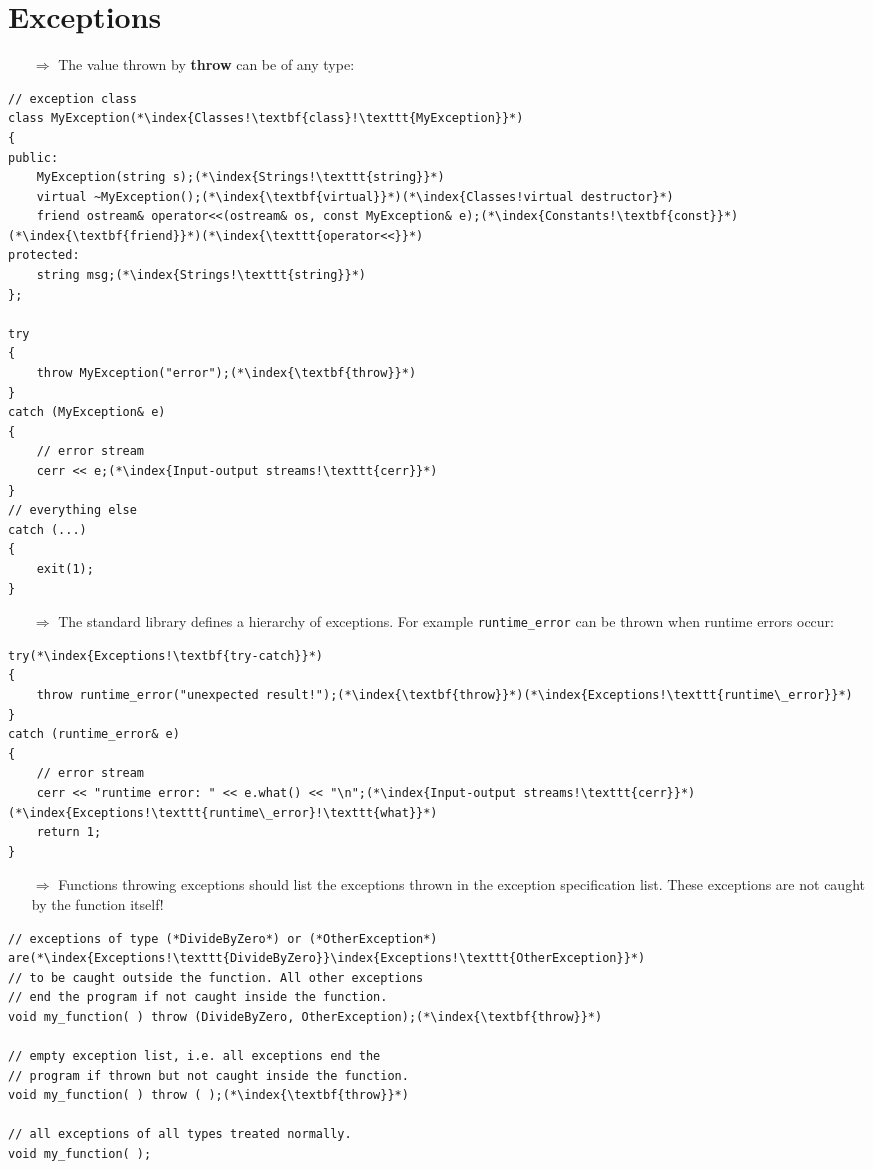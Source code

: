 \documentclass[10pt]{article}
\begin{document}
\section{Exceptions}
\small
\begin{enumerate}
\item[$\Rightarrow$] The value thrown by \textbf{throw} can be of any type:
\end{enumerate}
\begin{lstlisting}
// exception class
class MyException(*\index{Classes!\textbf{class}!\texttt{MyException}}*)
{
public:
    MyException(string s);(*\index{Strings!\texttt{string}}*)
    virtual ~MyException();(*\index{\textbf{virtual}}*)(*\index{Classes!virtual destructor}*)
    friend ostream& operator<<(ostream& os, const MyException& e);(*\index{Constants!\textbf{const}}*)(*\index{\textbf{friend}}*)(*\index{\texttt{operator<<}}*)
protected:
    string msg;(*\index{Strings!\texttt{string}}*)
};

try
{
    throw MyException("error");(*\index{\textbf{throw}}*)
}
catch (MyException& e)
{
    // error stream
    cerr << e;(*\index{Input-output streams!\texttt{cerr}}*)
}
// everything else
catch (...)
{
    exit(1);
}
\end{lstlisting}
\begin{enumerate}
\item[$\Rightarrow$] The standard library defines a hierarchy of exceptions.  For example \texttt{runtime\_error} can be thrown when runtime errors occur:
\end{enumerate}
\begin{lstlisting}
try(*\index{Exceptions!\textbf{try-catch}}*)
{
    throw runtime_error("unexpected result!");(*\index{\textbf{throw}}*)(*\index{Exceptions!\texttt{runtime\_error}}*)
}
catch (runtime_error& e)
{
    // error stream
    cerr << "runtime error: " << e.what() << "\n";(*\index{Input-output streams!\texttt{cerr}}*)(*\index{Exceptions!\texttt{runtime\_error}!\texttt{what}}*)
    return 1;
}
\end{lstlisting}
\begin{enumerate}
\item[$\Rightarrow$] Functions throwing exceptions should list the exceptions thrown in
the exception specification list. These exceptions are not caught by the function itself!
\end{enumerate}
\begin{lstlisting}
// exceptions of type (*DivideByZero*) or (*OtherException*) are(*\index{Exceptions!\texttt{DivideByZero}}\index{Exceptions!\texttt{OtherException}}*)
// to be caught outside the function. All other exceptions 
// end the program if not caught inside the function.
void my_function( ) throw (DivideByZero, OtherException);(*\index{\textbf{throw}}*)

// empty exception list, i.e. all exceptions end the
// program if thrown but not caught inside the function.
void my_function( ) throw ( );(*\index{\textbf{throw}}*)

// all exceptions of all types treated normally.
void my_function( );
\end{lstlisting}
\end{document}

